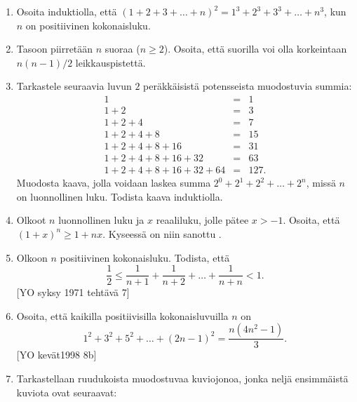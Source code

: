 \begin{enumerate}
\item Osoita induktiolla, että $(1 + 2 + 3 +\ldots + n)^2 = 1^3 + 2^3 + 3^3 + \ldots + n^3$, kun $n$ on positiivinen kokonaisluku.

\item Tasoon piirretään $n$ suoraa ($n\ge 2$). Osoita, että suorilla voi olla korkeintaan $n(n - 1)/2$ leikkauspistettä.

\item Tarkastele seuraavia luvun $2$ peräkkäisistä potensseista muodostuvia summia:
\[
\begin{array}{rcl}
1 &=& 1\\
1 + 2 &=& 3\\
1 + 2 + 4 &=& 7\\
1 + 2 + 4 + 8 &=& 15\\
1 + 2 + 4 + 8 + 16 &=& 31\\
1 + 2 + 4 + 8 + 16 + 32 &=& 63\\
1 + 2 + 4 + 8 + 16 + 32 + 64 &=& 127.
\end{array}
\]
Muodosta kaava, jolla voidaan laskea summa $2^0 + 2^1 + 2^2 + \ldots + 2^n$, missä $n$ on luonnollinen luku. Todista kaava induktiolla.

\item Olkoot $n$ luonnollinen luku ja $x$ reaaliluku, jolle pätee $x > -1$. Osoita, että $(1 + x)^n \ge 1 + nx$. Kyseessä on niin sanottu .

\item Olkoon $n$ positiivinen kokonaisluku. Todista, että
\[
\frac{1}{2}\le\frac{1}{n+1}+\frac{1}{n+2}+\ldots +\frac{1}{n+n} <1.
\]
[YO syksy 1971 tehtävä 7]


\item
Osoita, että kaikilla positiivisilla kokonaisluvuilla $n$ on
\[
1^2+3^2+5^2+\ldots+(2n-1)^2 = \frac{n(4n^2-1)}{3}. 
\]
[YO kevät1998 8b]

\item Tarkastellaan ruudukoista muodostuvaa kuviojonoa, jonka neljä ensimmäistä kuviota ovat seuraavat:


\end{enumerate}
